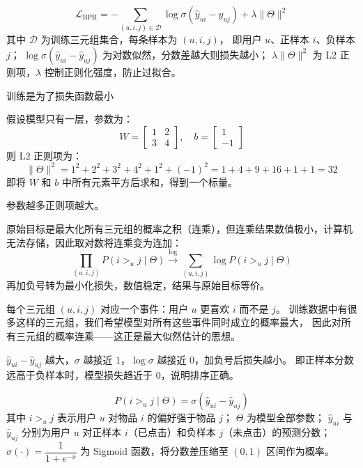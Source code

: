 \begin{definition}[BPR损失函数]
$$
\mathcal{L}_{\text{BPR}} = -\sum_{(u,i,j) \in \mathcal{D}} \log \sigma(\hat{y}_{ui} - \hat{y}_{uj}) + \lambda \|\Theta\|^2
$$
其中 $\mathcal{D}$ 为训练三元组集合，每条样本为 $(u, i, j)$，
即用户 $u$、正样本 $i$、负样本 $j$；
$\log \sigma(\hat{y}_{ui} - \hat{y}_{uj})$ 为对数似然，分数差越大则损失越小；
$\lambda \|\Theta\|^2$ 为 L2 正则项，$\lambda$ 控制正则化强度，防止过拟合。
\end{definition}
\begin{dxtips}
    训练是为了损失函数最小
\end{dxtips}
\begin{example}
假设模型只有一层，参数为：
$$
W = \begin{bmatrix} 1 & 2 \\ 3 & 4 \end{bmatrix}, \quad b = \begin{bmatrix} 1 \\ -1 \end{bmatrix}
$$
则 L2 正则项为：
$$
\|\Theta\|^2 = 1^2 + 2^2 + 3^2 + 4^2 + 1^2 + (-1)^2 = 1+4+9+16+1+1 = 32
$$
即将 $W$ 和 $b$ 中所有元素平方后求和，得到一个标量。
\end{example}
参数越多正则项越大。
\begin{note}
原始目标是最大化所有三元组的概率之积（连乘），但连乘结果数值极小，计算机无法存储，因此取对数将连乘变为连加：
$$
\prod_{(u,i,j)} P(i >_u j \mid \Theta) \xrightarrow{\log} \sum_{(u,i,j)} \log P(i >_u j \mid \Theta)
$$
再加负号转为最小化损失，数值稳定，结果与原始目标等价。
\end{note}
\begin{note}
每个三元组 $(u,i,j)$ 对应一个事件：用户 $u$ 更喜欢 $i$ 而不是 $j$。
训练数据中有很多这样的三元组，我们希望模型对所有这些事件同时成立的概率最大，
因此对所有三元组的概率连乘——这正是最大似然估计的思想。
\end{note}
\begin{note}
$\hat{y}_{ui} - \hat{y}_{uj}$ 越大，$\sigma$ 越接近 $1$，$\log\sigma$ 越接近 $0$，加负号后损失越小。
即正样本分数远高于负样本时，模型损失趋近于 $0$，说明排序正确。
\end{note}

\begin{definition}[贝叶斯后验概率近似方法]
$$
P(i >_u j \mid \Theta) = \sigma(\hat{y}_{ui} - \hat{y}_{uj})
$$
其中 $i >_u j$ 表示用户 $u$ 对物品 $i$ 的偏好强于物品 $j$；
$\Theta$ 为模型全部参数；
$\hat{y}_{ui}$ 与 $\hat{y}_{uj}$ 分别为用户 $u$ 对正样本 $i$（已点击）和负样本 $j$（未点击）的预测分数；
$\sigma(\cdot) = \dfrac{1}{1+e^{-x}}$ 为 Sigmoid 函数，将分数差压缩至 $(0,1)$ 区间作为概率。
\end{definition}

